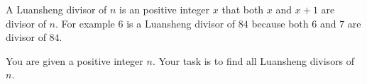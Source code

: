 A Luansheng divisor of $n$ is an positive integer $x$ that both $x$ and $x+1$ are divisor of $n$.
For example $6$ is a Luansheng divisor of $84$ because both $6$ and $7$ are divisor of $84$.

You are given a positive integer $n$. 
Your task is to find all Luansheng divisors of $n$.

